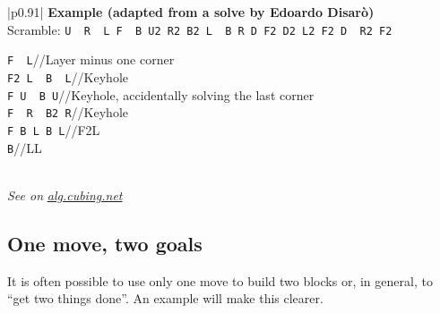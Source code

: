 \documentclass[11pt,a4paper]{book}
\newcommand{\p}{\textquotesingle}
\newcommand{\m}{\texttt}
\newcommand{\ps}{\p\,\,}
\newcommand{\comment}[1]{{\color{gray}\quad//#1}}
\begin{document}
\bigskip
\begin{tabular}{|p{}|}
\hline
\textbf{Example (adapted from a solve by Edoardo Disarò)}\\
\hline
Scramble: \m{U\ps R\ps L F\ps B U2 R2 B2 L\ps B R D F2 D2 L2 F2 D\ps R2 F2}\\
\hline
\begin{minipage}[l]{0.650\textwidth}
\m{F\ps L\p}\comment{Layer minus one corner}\\
\m{F2 L\ps B\ps L}\comment{Keyhole}\\
\m{F U\ps B U}\comment{Keyhole, accidentally solving the last corner}\\
\m{F\ps R\ps B2 R}\comment{Keyhole}\\
\m{F B L B L\p}\comment{F2L}\\
\m{B\p}\comment{LL}
\end{minipage}
\begin{minipage}[c]{0.25\textwidth}

\end{minipage}\\
\hline
\emph{See on }\href{https://alg.cubing.net/?setup=U-_R-_L_F-_B_U2_R2_B2_L-_B_R_D_F2_D2_L2_F2_D-_R2_F2&alg=F-_L-_\%2F\%2FLayer_minus_one_corner\%0AF2_L-_B-_L_\%2F\%2FKeyhole\%0AF_U-_B_U_\%2F\%2FKeyhole,_accidentally_solving_the_last_corner\%0AF-_R-_B2_R_\%2F\%2FKeyhole\%0AF_B_L_B_L-_\%2F\%2FF2L\%0AB-_\%2F\%2FLL}{\emph{alg.cubing.net}}\\
\hline
\end{tabular}
\bigskip

\subsection{One move, two goals}

It is often possible to use only one move to build two blocks or, in general, to ``get two things done''. An example will make this clearer.
\end{document}
